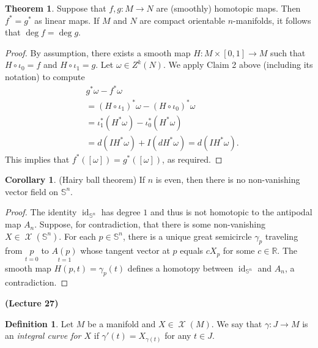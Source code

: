 \documentclass[10pt,letterpaper,cm]{nupset}
\theoremstyle{definition}
\newtheorem*{definition}{Definition}
\newtheorem{theorem}{Theorem}
\newtheorem{corollary}{Corollary}
\newcommand{\R}{\mathbb R}
\renewcommand{\S}{\mathbb S}
\newcommand{\1}{\mathbf{1}}
\newcommand{\0}{\vec 0}
\DeclareMathOperator{\id}{id}
\DeclareMathOperator{\vf}{\mathscr{X}}
\begin{document}
\begin{theorem}
Suppose that $f,g: M \to N$ are (smoothly) homotopic maps. Then $f^{\ast} = g^{\ast}$ as linear maps. If $M$ and $N$ are compact orientable $n$-manifolds, it follows that $\deg f= \deg g$.
\end{theorem}
\begin{proof}
By assumption, there exists a smooth map $H: M \times [0,1] \to M$ such that $H \circ \iota_0 =f$ and $H \circ \iota_1 = g$. Let $\omega \in Z^k(N)$. We apply Claim 2 above (including its notation) to compute
\begin{align*}
& g^{\ast} \omega - f^{\ast} \omega 
\\ & = (H \circ \iota_1)^{\ast} \omega - (H \circ \iota_0)^{\ast} \omega
\\ & = \iota_1^{\ast} (H^{\ast} \omega) -  \iota_0^{\ast} (H^{\ast} \omega)
\\ & = d(IH^{\ast}\omega)+I(dH^{\ast}\omega) = d(IH^{\ast}\omega).
\end{align*} 
This implies that $f^{\ast}([\omega]) = g^{\ast}([\omega])$, as required. 
\end{proof}

\begin{corollary}{(Hairy ball theorem)} 
If $n$ is even, then there is no non-vanishing vector field on $\S^n$.
\end{corollary}
\begin{proof}
The identity $\id_{\S^n}$ has degree $1$ and thus is not homotopic to the antipodal map $A_n$. Suppose, for contradiction, that there is some non-vanishing $X\in \vf(\S^n)$. For each $p\in \S^n$, there is a unique great semicircle $\gamma_p$ traveling from $\underset{t=0}{p}$ to $\underset{t=1}{A(p)}$ whose tangent vector at $p$ equals $c X_p$ for some $c\in \R$. The smooth map $H(p, t) =\gamma_p(t)$ defines a homotopy between $\id_{\S^n}$  and $A_n$, a contradiction. 
\end{proof}

\begin{center}
{\textbf{(Lecture 27)}} 
\end{center}

\begin{definition}
Let $M$ be a manifold and $X\in \vf(M)$. We say that $\gamma : J \to M$ is an \textit{integral curve for $X$} if $\gamma'(t) = X_{\gamma(t)}$ for any $t\in J$.
\end{definition}
\end{document}
